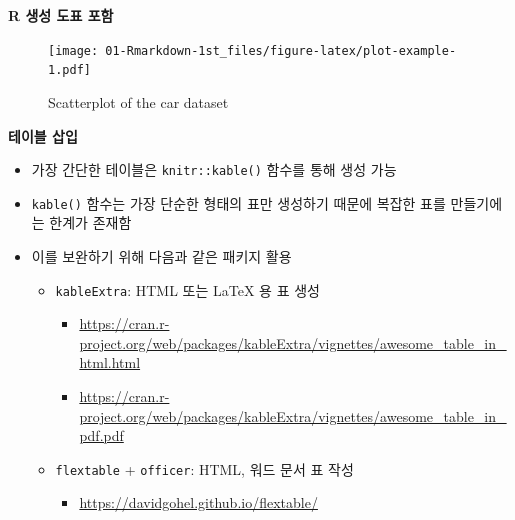 \documentclass[
  11pt,
]{krantz}
\newenvironment{Shaded}{\begin{snugshade}}{\end{snugshade}}
\newcommand{\BaseNTok}[1]{\textcolor[rgb]{0.06,0.06,0.06}{#1}}
\providecommand{\tightlist}{%
  \setlength{\itemsep}{0pt}\setlength{\parskip}{0pt}}
\begin{document}
\normalsize

\begin{Shaded}
\end{Shaded}

\textbf{R 생성 도표 포함}

\footnotesize

\begin{figure}
\centering
\texttt{[image: 01-Rmarkdown-1st\_files/figure-latex/plot-example-1.pdf]}
\caption{\label{fig:plot-example}Scatterplot of the car dataset}
\end{figure}

\normalsize

\textbf{테이블 삽입}

\begin{itemize}
\tightlist
\item
  가장 간단한 테이블은 \texttt{knitr::kable()} 함수를 통해 생성 가능
\item
  \texttt{kable()} 함수는 가장 단순한 형태의 표만 생성하기 때문에 복잡한 표를 만들기에는 한계가 존재함
\item
  이를 보완하기 위해 다음과 같은 패키지 활용

  \begin{itemize}
  \tightlist
  \item
    \texttt{kableExtra}: HTML 또는 LaTeX 용 표 생성

    \begin{itemize}
    \tightlist
    \item
      \url{https://cran.r-project.org/web/packages/kableExtra/vignettes/awesome_table_in_html.html}
    \item
      \url{https://cran.r-project.org/web/packages/kableExtra/vignettes/awesome_table_in_pdf.pdf}
    \end{itemize}
  \item
    \texttt{flextable} + \texttt{officer}: HTML, 워드 문서 표 작성

    \begin{itemize}
    \tightlist
    \item
      \url{https://davidgohel.github.io/flextable/}
    \end{itemize}
  \end{itemize}
\end{itemize}
\end{document}
